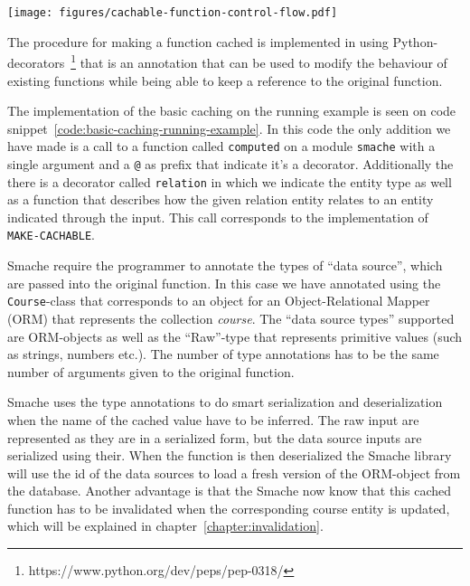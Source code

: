 \begin{figure*}[ht!]
  \centering
  \texttt{[image: figures/cachable-function-control-flow.pdf]}
  \caption{The control flow during a call to a function cached through Smache}
  \label{fig:cachable-function-control-flow}
\end{figure*}

The procedure for making a function cached is implemented in using Python-decorators~\footnote{https://www.python.org/dev/peps/pep-0318/} that is an annotation that can be used to modify the behaviour of existing functions while being able to keep a reference to the original function.

The implementation of the basic caching on the running example is seen on code snippet~\ref{code:basic-caching-running-example}. In this code the only addition we have made is a call to a function called \verb$computed$ on a module \verb$smache$ with a single argument and a \verb$@$ as prefix that indicate it's a decorator. Additionally the there is a decorator called \verb$relation$ in which we indicate the entity type as well as a function that describes how the given relation entity relates to an entity indicated through the input. This call corresponds to the implementation of \verb$MAKE-CACHABLE$.

Smache require the programmer to annotate the types of ``data source'', which are passed into the original function. In this case we have annotated using the \verb$Course$-class that corresponds to an object for an Object-Relational Mapper (ORM) that represents the collection \emph{course}. The ``data source types'' supported are ORM-objects as well as the ``Raw''-type that represents primitive values (such as strings, numbers etc.). The number of type annotations has to be the same number of arguments given to the original function.

Smache uses the type annotations to do smart serialization and deserialization when the name of the cached value have to be inferred. The raw input are represented as they are in a serialized form, but the data source inputs are serialized using their. When the function is then deserialized the Smache library will use the id of the data sources to load a fresh version of the ORM-object from the database. Another advantage is that the Smache now know that this cached function has to be invalidated when the corresponding course entity is updated, which will be explained in chapter~\ref{chapter:invalidation}.

\begin{figure*}[ht!]
  
  \caption{Implementation of basic caching on the running example}
  \label{code:basic-caching-running-example}
\end{figure*}

